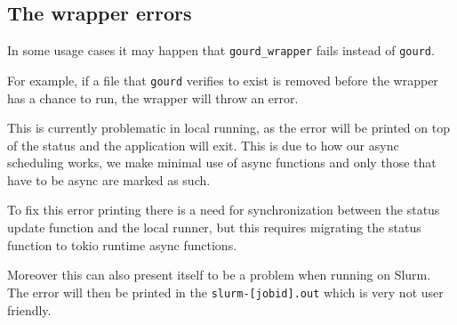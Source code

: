 \subsection{The wrapper errors}

In some usage cases it may happen that \texttt{gourd\_wrapper} fails
instead of \texttt{gourd}.

For example, if a file that \texttt{gourd} verifies to exist is removed
before the wrapper has a chance to run, the wrapper will throw an error.

This is currently problematic in local running, as the error will be
printed on top of the status and the application will exit.
This is due to how our async scheduling works, we make minimal use
of async functions and only those that have to be async are marked as such.

To fix this error printing there is a need for synchronization between
the status update function and the local runner, but this requires migrating
the status function to tokio runtime async functions.

Moreover this can also present itself to be a problem when running on Slurm.
The error will then be printed in the \texttt{slurm-[jobid].out} which is
very not user friendly.
